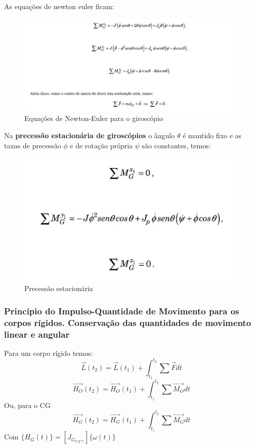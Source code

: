 \documentclass[a4paper, 12pt]{article}
\begin{document}
		As equações de newton euler ficam:
		\begin{figure}[h]
			\center
			\includegraphics[scale=0.7]{imagens/a10.png} 
			\caption{Equações de Newton-Euler para o giroscópio}
		\end{figure}

		Na \textbf{precessão estacionária de giroscópios} o ângulo $\theta$ é mantido fixo e as taxas de precessão $\phi$ e de rotação própria $\psi$ são constantes, temos:
		 \begin{figure}[h]
			\center
			\includegraphics[scale=0.7]{imagens/a11.png} 
			\caption{Precessão estacionária}
		\end{figure}

		\subsubsection{Princípio do Impulso-Quantidade de Movimento para os corpos rígidos. Conservação das quantidades de movimento linear e angular}
		Para um corpo rígido temos:
		\begin{equation}
			\vec{L}(t_2) = \vec{L}(t_1) + \int^{t_2}_{t_1} \sum \vec{F}dt
		\end{equation}
		\begin{equation}
			\vec{H_O}(t_2) = \vec{H_O}(t_1) + \int^{t_2}_{t_1} \sum \vec{M_O}dt
		\end{equation}
		Ou, para o CG
		\begin{equation}
			\vec{H_G}(t_2) = \vec{H_G}(t_1) + \int^{t_2}_{t_1} \sum \vec{M_G}dt
		\end{equation}
		Com $\{H_G(t)\} = [J_{G_{x'y'z'}}]\{\omega (t)\}$\\
		
\end{document}
